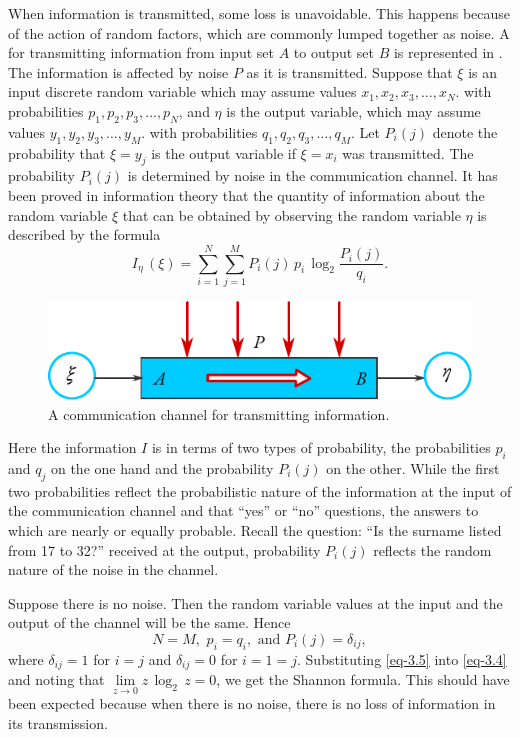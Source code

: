  When information is transmitted, some loss is unavoidable. This happens because of the action of random factors, which are commonly lumped together as noise. A  for transmitting information from input set $A$ to output set $B$ is represented in . The information is affected by noise $P$ as it is transmitted. Suppose that $\xi$ is an input discrete random variable which may assume values $x_{1}, x_{2}, x_{3},\ldots{} , x_{N}$. with probabilities  $p_{1}, p_{2}, p_{3},\ldots{} , p_{N}$, and $\eta$ is the output variable, which may assume values $y_{1}, y_{2}, y_{3},\ldots , y_{M}$. with probabilities  $q_{1}, q_{2}, q_{3},\ldots{} , q_{M}$. Let $P_{i}(j)$ denote the probability that $\xi = y_{j}$ is the output variable if $\xi = x_{i}$ was transmitted. The probability $P_{i}(j)$ is determined by noise in the communication channel. It has been proved in information theory that the quantity of information about the random variable $\xi$ that can be obtained by observing the random variable $\eta$ is described by the formula
\begin{equation}%
I_{\eta} \, (\xi) = \sum_{i=1}^{N}\sum_{j=1}^{M} P_{i}(j) \, p_{i}  \, \log_{2} \frac{P_{i}(j)}{q_{i}}.
\label{eq-3.4}
\end{equation}
\begin{figure}[!ht]
 \centering
 \includegraphics[width=0.8\linewidth]{figures/comm-channel.pdf}
\caption{A communication channel for transmitting information.\label{comm-channel}}
\end{figure}
Here the information $I$ is in terms of two types of probability, the
probabilities $p_{i}$ and $q_{j}$ on the one hand and the probability $P_{i}(j)$ on the other. While the first two probabilities reflect the probabilistic nature of
the information at the input of the communication channel and that
``yes'' or ``no'' questions, the answers to which are nearly or equally
probable. Recall the question: ``Is the surname listed from 17 to 32?''
received at the output, probability $P_{i}(j)$ reflects the random nature of
the noise in the channel.

Suppose there is no noise. Then the random variable values at the
input and the output of the channel will be the same. Hence
\begin{equation}%
N = M, \,\, p_{i}= q_{i}, \,\, \text{and} \,\, P_{i}(j) = \delta_{ij},
\label{eq-3.5}
\end{equation}
where $\delta_{ij}=1$ for $i = j$ and $\delta_{ij} = 0$ for $i =1= j$.
Substituting \eqref{eq-3.5} into \eqref{eq-3.4} and noting that $\lim\limits_{z \to 0} z \, \log_{2} \, z = 0$, we get the Shannon formula. This should have been expected because when there is no noise, there is no loss of information in its transmission.



